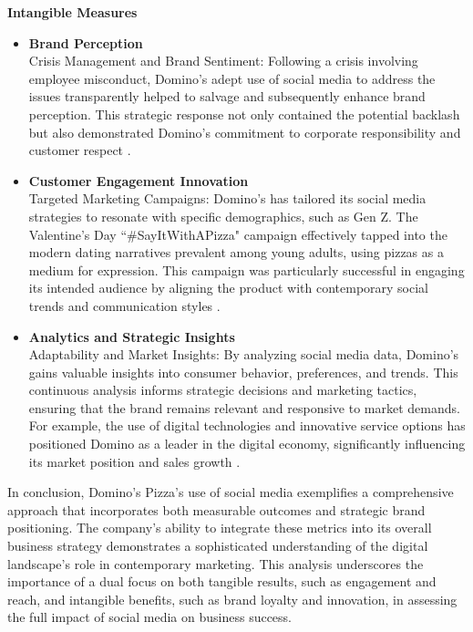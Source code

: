 \documentclass[12pt,a4paper]{article}
\begin{document}
\noindent\textbf{Intangible Measures}

\begin{itemize}
    \item \textbf{Brand Perception} \\
    \noindent Crisis Management and Brand Sentiment: Following a crisis involving employee misconduct, Domino's adept use of social media to address the issues transparently helped to salvage and subsequently enhance brand perception. This strategic response not only contained the potential backlash but also demonstrated Domino's commitment to corporate responsibility and customer respect \citep{question_2.3}.\\
    
    \item \textbf{Customer Engagement Innovation}\\
    \noindent Targeted Marketing Campaigns: Domino's has tailored its social media strategies to resonate with specific demographics, such as Gen Z. The Valentine's Day ``\#SayItWithAPizza" campaign effectively tapped into the modern dating narratives prevalent among young adults, using pizzas as a medium for expression. This campaign was particularly successful in engaging its intended audience by aligning the product with contemporary social trends and communication styles \citep{question_2.4}.\\

    \item \textbf{Analytics and Strategic Insights}\\
    \noindent Adaptability and Market Insights: By analyzing social media data, Domino's gains valuable insights into consumer behavior, preferences, and trends. This continuous analysis informs strategic decisions and marketing tactics, ensuring that the brand remains relevant and responsive to market demands. For example, the use of digital technologies and innovative service options has positioned Domino as a leader in the digital economy, significantly influencing its market position and sales growth \citep{question_2.5}.\\
\end{itemize}

\noindent In conclusion, Domino's Pizza's use of social media exemplifies a comprehensive approach that incorporates both measurable outcomes and strategic brand positioning. The company's ability to integrate these metrics into its overall business strategy demonstrates a sophisticated understanding of the digital landscape's role in contemporary marketing. This analysis underscores the importance of a dual focus on both tangible results, such as engagement and reach, and intangible benefits, such as brand loyalty and innovation, in assessing the full impact of social media on business success.
\end{document}
